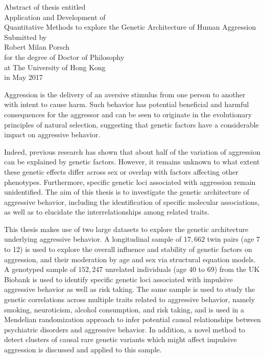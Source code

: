 \documentclass[header.tex]{subfiles}
\begin{document}
\begin{center}
  Abstract of thesis entitled \\
  \vspace*{\baselineskip}
  {\LARGE Application and Development of \\ Quantitative Methods to explore the Genetic Architecture of Human Aggression}\\[0.2\baselineskip]
  \vspace*{\baselineskip}
  Submitted by\\
  \vspace*{\baselineskip}
  {\LARGE Robert Milan Porsch}\\
  \vspace*{\baselineskip}
  for the degree of Doctor of Philosophy \\ at The University of Hong Kong \\ in May 2017
\end{center}


Aggression is the delivery of an aversive stimulus from one person to another with intent to cause harm.
Such behavior has potential beneficial and harmful consequences for the aggressor and can be seen to originate in the evolutionary principles of natural selection,
suggesting that genetic factors have a considerable impact on aggressive behavior.

Indeed, previous research has shown that about half of the variation of aggression can be explained by genetic factors.
However, it remains unknown to what extent these genetic effects differ across sex or overlap with factors affecting other phenotypes.
Furthermore, specific genetic loci associated with aggression remain unidentified.
The aim of this thesis is to investigate the  genetic architecture of aggressive behavior, including the identification of specific molecular associations, as well as to elucidate the interrelationships among related traits. 

This thesis makes use of two large datasets to explore the genetic architecture underlying aggressive behavior.
A longitudinal sample of $17,662$ twin pairs (age 7 to 12) is used to explore the overall influence and stability of genetic factors on aggression, and their moderation by  age and sex  via structural equation models.
A genotyped sample of $152,247$ unrelated individuals (age 40 to 69) from the UK Biobank is used to identify specific genetic loci associated with impulsive aggressive behavior as well as risk taking.
The same sample is  used to study the genetic correlations across multiple traits related to aggressive behavior, namely smoking, neuroticism, alcohol consumption, and risk taking, and is used in a Mendelian randomization approach to infer potential causal relationships between psychiatric disorders and aggressive behavior.
In addition, a novel method to detect clusters of causal rare genetic variants which might affect impulsive aggression is discussed and applied to this sample. 
\end{document}
